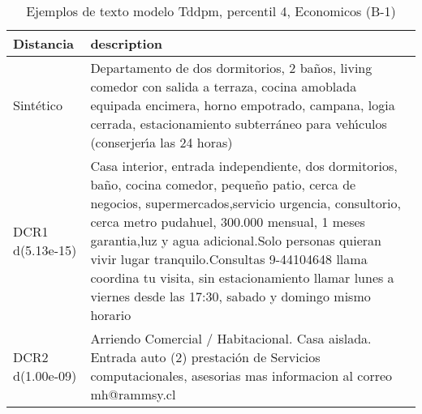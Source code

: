 \begin{table}[H]
\centering
\fontsize{10}{14}\selectfont
\caption{Ejemplos de texto modelo Tddpm, percentil 4, Economicos (B-1)}
\label{table-example-economicos-b-1-tddpm_mlp-4p-text}
\begin{tabular}{|l|m{35em}|}
\hline
\rowcolor[gray]{0.8}
Distancia & description \\
\hline Sintético & Departamento de dos dormitorios, 2 ba\~nos, living comedor con salida a terraza, cocina amoblada equipada encimera, horno empotrado, campana, logia cerrada, estacionamiento subterr\'aneo para veh{\'\i}culos (conserjer{\'\i}a las 24 horas) \\
\hline DCR1 d(5.13e-15) & Casa interior, entrada independiente, dos dormitorios, ba\~no, cocina comedor, peque\~no patio, cerca de negocios, supermercados,servicio urgencia, consultorio, cerca metro pudahuel, 300.000 mensual, 1 meses garantia,luz y agua adicional.Solo personas quieran vivir lugar tranquilo.Consultas 9-44104648
llama coordina tu visita, sin estacionamiento
llamar lunes a viernes desde las 17:30, sabado y domingo mismo horario \\
\hline DCR2 d(1.00e-09) & Arriendo Comercial / Habitacional. Casa aislada. Entrada auto (2) prestaci\'on de Servicios computacionales, asesorias  mas informacion al correo mh@rammsy.cl \\
\hline
\end{tabular}
\end{table}
